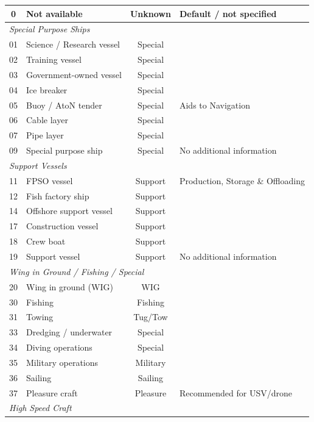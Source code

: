 \begin{longtable}{clcl}
0   & Not available             & Unknown  & Default / not specified \\
\midrule
\multicolumn{4}{l}{\textit{Special Purpose Ships}} \\
\midrule
01  & Science / Research vessel & Special  & \\
02  & Training vessel           & Special  & \\
03  & Government-owned vessel   & Special  & \\
04  & Ice breaker               & Special  & \\
05  & Buoy / AtoN tender        & Special  & Aids to Navigation \\
06  & Cable layer               & Special  & \\
07  & Pipe layer                & Special  & \\
09  & Special purpose ship      & Special  & No additional information \\
\midrule
\multicolumn{4}{l}{\textit{Support Vessels}} \\
\midrule
11  & FPSO vessel               & Support  & Production, Storage \& Offloading \\
12  & Fish factory ship         & Support  & \\
14  & Offshore support vessel   & Support  & \\
17  & Construction vessel       & Support  & \\
18  & Crew boat                 & Support  & \\
19  & Support vessel            & Support  & No additional information \\
\midrule
\multicolumn{4}{l}{\textit{Wing in Ground / Fishing / Special}} \\
\midrule
20  & Wing in ground (WIG)      & WIG      & \\
30  & Fishing                   & Fishing  & \\
31  & Towing                    & Tug/Tow  & \\
33  & Dredging / underwater     & Special  & \\
34  & Diving operations         & Special  & \\
35  & Military operations       & Military & \\
36  & Sailing                   & Sailing  & \\
37  & Pleasure craft            & Pleasure & Recommended for USV/drone \\
\midrule
\multicolumn{4}{l}{\textit{High Speed Craft}} \\

\end{longtable}
